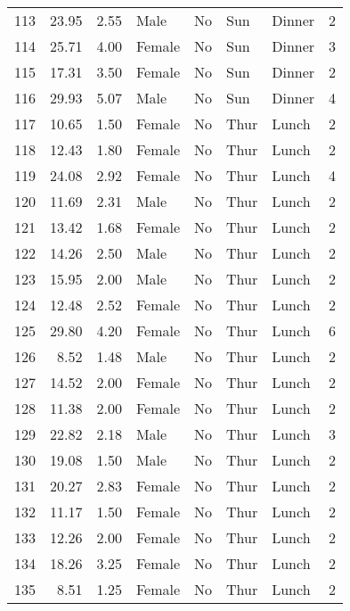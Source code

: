\begin{tabular}{lrrllllr}
113 &       23.95 &   2.55 &    Male &     No &   Sun &  Dinner &     2 \\
114 &       25.71 &   4.00 &  Female &     No &   Sun &  Dinner &     3 \\
115 &       17.31 &   3.50 &  Female &     No &   Sun &  Dinner &     2 \\
116 &       29.93 &   5.07 &    Male &     No &   Sun &  Dinner &     4 \\
117 &       10.65 &   1.50 &  Female &     No &  Thur &   Lunch &     2 \\
118 &       12.43 &   1.80 &  Female &     No &  Thur &   Lunch &     2 \\
119 &       24.08 &   2.92 &  Female &     No &  Thur &   Lunch &     4 \\
120 &       11.69 &   2.31 &    Male &     No &  Thur &   Lunch &     2 \\
121 &       13.42 &   1.68 &  Female &     No &  Thur &   Lunch &     2 \\
122 &       14.26 &   2.50 &    Male &     No &  Thur &   Lunch &     2 \\
123 &       15.95 &   2.00 &    Male &     No &  Thur &   Lunch &     2 \\
124 &       12.48 &   2.52 &  Female &     No &  Thur &   Lunch &     2 \\
125 &       29.80 &   4.20 &  Female &     No &  Thur &   Lunch &     6 \\
126 &        8.52 &   1.48 &    Male &     No &  Thur &   Lunch &     2 \\
127 &       14.52 &   2.00 &  Female &     No &  Thur &   Lunch &     2 \\
128 &       11.38 &   2.00 &  Female &     No &  Thur &   Lunch &     2 \\
129 &       22.82 &   2.18 &    Male &     No &  Thur &   Lunch &     3 \\
130 &       19.08 &   1.50 &    Male &     No &  Thur &   Lunch &     2 \\
131 &       20.27 &   2.83 &  Female &     No &  Thur &   Lunch &     2 \\
132 &       11.17 &   1.50 &  Female &     No &  Thur &   Lunch &     2 \\
133 &       12.26 &   2.00 &  Female &     No &  Thur &   Lunch &     2 \\
134 &       18.26 &   3.25 &  Female &     No &  Thur &   Lunch &     2 \\
135 &        8.51 &   1.25 &  Female &     No &  Thur &   Lunch &     2 \\

\end{tabular}
